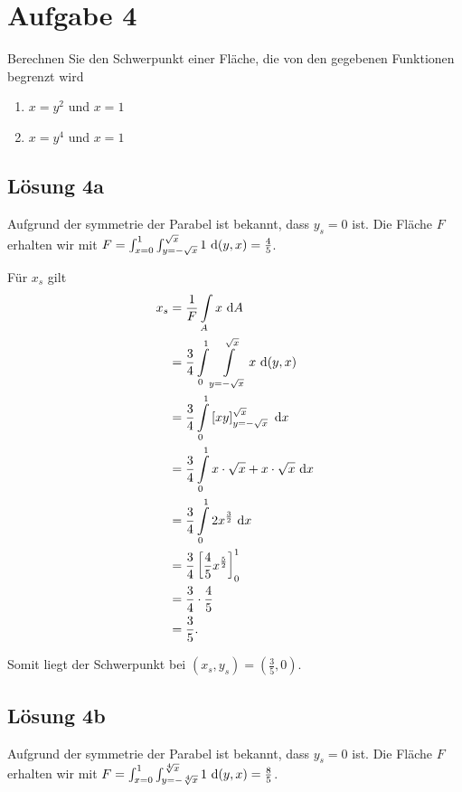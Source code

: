 \documentclass[main.tex]{subfiles}
\begin{document}
\section{Aufgabe 4}
Berechnen Sie den Schwerpunkt einer Fläche, die von den gegebenen Funktionen begrenzt wird
\begin{enumerate}
    \item $x = y^2$ \quad und \quad $x = 1$
    \item $x = y^4$ \quad und \quad $x = 1$
\end{enumerate}

\subsection{Lösung 4a}
Aufgrund der symmetrie der Parabel ist bekannt, dass $y_s=0$ ist. 
Die Fläche $F$ erhalten wir mit $F = \int_{x=0}^{1} \int_{y=-\sqrt{x}}^{\sqrt{x}} 1 ~\mathrm{d}(y,x) = \frac{4}{5}$.

Für $x_s$ gilt
\begin{align*}
    x_s &= \frac{1}{F} \int \limits_A x ~\mathrm{d}A \\
        &= \frac{3}{4} \int \limits_{0}^{1} \int \limits_{y=-\sqrt{x}}^{\sqrt{x}} x ~\mathrm{d}(y,x) \\
        &= \frac{3}{4} \int \limits_{0}^{1} \left[ xy \right]_{y=-\sqrt{x}}^{\sqrt{x}} ~\mathrm{d}x \\
        &= \frac{3}{4} \int \limits_{0}^{1} x\cdot \sqrt{x} + x\cdot \sqrt{x} ~\mathrm{d}x \\
        &= \frac{3}{4} \int \limits_{0}^{1} 2 {x}^{\frac{3}{2}} ~\mathrm{d}x \\
        &= \frac{3}{4} \left[ \frac{4}{5} {x}^{\frac{5}{2}} \right]_{0}^{1} \\
        &= \frac{3}{4} \cdot \frac{4}{5}  \\
        &= \frac{3}{5}. \\
\end{align*}

Somit liegt der Schwerpunkt bei $(x_s, y_s) = \left(\frac{3}{5}, 0\right)$.

\subsection{Lösung 4b}

Aufgrund der symmetrie der Parabel ist bekannt, dass $y_s=0$ ist. 
Die Fläche $F$ erhalten wir mit $F = \int_{x=0}^{1} \int_{y=-\sqrt[4]{x}}^{\sqrt[4]{x}} 1 ~\mathrm{d}(y,x) = \frac{8}{5}$.
\end{document}
